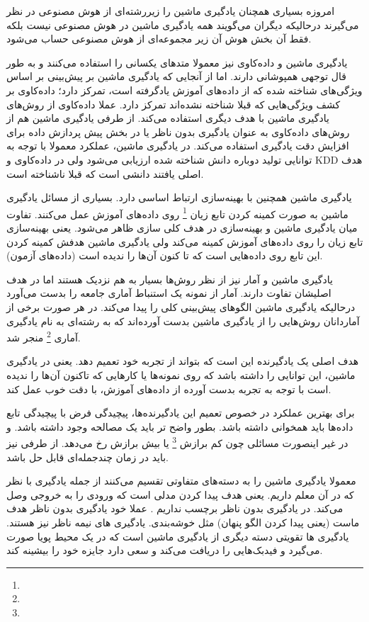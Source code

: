 \documentclass[a4paper, 12pt]{article}
\begin{document}
امروزه بسیاری همچنان یادگیری ماشین را زیررشته‌ای از هوش مصنوعی در نظر می‌گیرند درحالیکه دیگران می‌گویند همه یادگیری ماشین در هوش مصنوعی نیست بلکه فقط آن بخش هوش آن زیر مجموعه‌ای از هوش مصنوعی حساب می‌شود. 

یادگیری ماشین و داده‌کاوی نیز معمولا متد‌های یکسانی را استفاده می‌کنند و به طور قال توجهی همپوشانی دارند. اما از آنجایی که یادگیری ماشین بر پیش‌بینی بر اساس ویژگی‌های شناخته شده که از داده‌های آموزش یادگرفته است، تمرکز دارد؛ داده‌کاوی بر کشف ویژگی‌هایی که قبلا شناخته نشده‌اند تمرکز دارد. عملا داده‌کاوی از روش‌های یادگیری ماشین با هدف دیگری استفاده می‌کند. از طرفی یادگیری ماشین هم از روش‌های داده‌کاوی به عنوان یادگیری بدون ناظر یا در بخش پیش پردازش داده برای افزایش دقت یادگیری استفاده می‌کند. در یادگیری ماشین، عملکرد معمولا با توجه به توانایی تولید دوباره دانش شناخته شده ارزیابی می‌شود ولی در داده‌کاوی و KDD هدف اصلی یافتند دانشی است که قبلا ناشناخته است. 

یادگیری ماشین همچنین با بهینه‌سازی ارتباط اساسی دارد. بسیاری از مسائل یادگیری ماشین به صورت کمینه کردن تابع زیان 
\footnote{}
روی داده‌های آموزش عمل می‌کنند.  
تفاوت میان یادگیری ماشین و بهینه‌سازی در هدف کلی سازی ظاهر می‌شود. یعنی بهینه‌سازی تابع زیان را روی داده‌های آموزش کمینه می‌کند ولی یادگیری ماشین هدفش کمینه کردن این تابع روی داده‌هایی است که تا کنون آن‌ها را ندیده است (داده‌های آزمون). 

یادگیری ماشین و آمار نیز از نظر روش‌ها بسیار به هم نزدیک هستند اما در هدف اصلیشان تفاوت دارند. آمار از نمونه یک استنباط آماری جامعه را بدست می‌آورد درحالیکه یادگیری ماشین الگو‌های پیش‌بینی کلی را پیدا می‌کند. در هر صورت برخی از آماردانان روش‌هایی را از یادگیری ماشین بدست آورده‌اند  که به رشته‌ای به نام یادگیری آماری 
\footnote{}
منجر شد.
   
   هدف اصلی یک یادگیرنده این است که بتواند از تجربه خود تعمیم دهد. یعنی در یادگیری ماشین، این توانایی را داشته باشد که روی نمونه‌ها یا کار‌هایی که تاکنون آن‌ها را ندیده است با توجه به تجربه بدست آورده از داده‌های آموزش، با دقت خوب عمل کند. 
   
   برای بهترین عملکرد در خصوص تعمیم این یادگیرنده‌ها، پیچیدگی فرض با پیچیدگی تابع داده‌ها باید همخوانی داشته باشد. بطور واضح تر باید یک مصالحه وجود داشته باشد. و در غیر اینصورت مسائلی چون کم برازش 
   \footnote{}
   یا بیش برازش
   رخ می‌دهد. از طرفی نیز باید در زمان چندجمله‌ای قابل حل باشد.
   
   معمولا یادگیری ماشین را به دسته‌های متفاوتی تقسیم می‌کنند از جمله یادگیری با نظر که در آن معلم داریم. یعنی هدف پیدا کردن مدلی است که ورودی را به خروجی وصل می‌کند. در یادگیری بدون ناظر برچسب نداریم . عملا خود یادگیری بدون ناظر هدف ماست (یعنی پیدا کردن الگو پنهان) مثل خوشه‌بندی. یادگیری های نیمه ناظر نیز هستند. یادگیری ها تقویتی دسته دیگری از یادگیری ماشین است که در یک محیط پویا صورت می‌گیرد و فیدبک‌هایی را دریافت می‌کند و سعی دارد جایزه خود را بیشینه کند. 
   
\end{document}
